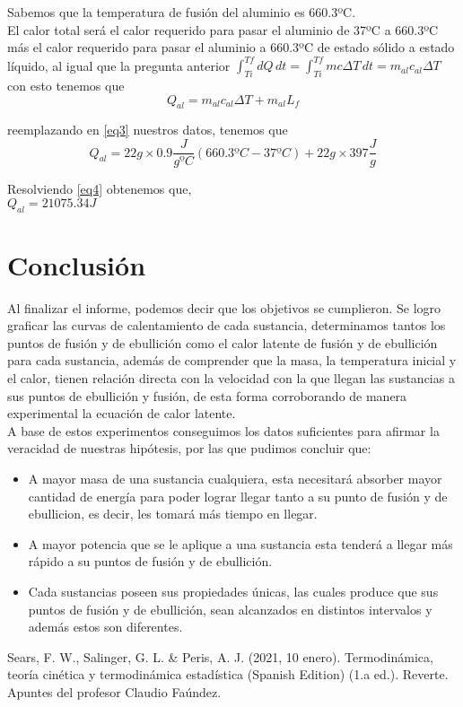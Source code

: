 \documentclass[a4paper, 12p]{article}
\begin{document}
\begin{enumerate}
		     Sabemos que la temperatura de fusión del aluminio es 660.3ºC.\\
		     El calor total será el calor requerido para pasar el aluminio de 37ºC a 660.3ºC más el calor requerido para pasar el aluminio a 660.3ºC de estado sólido a estado líquido, al igual que la pregunta anterior $\int_{Ti}^{Tf} \!dQ \, dt  = \int_{Ti}^{Tf} \! mc \Delta T \, dt =  m_{al}c_{al} \Delta T $ con esto tenemos que
		     \begin{equation}\label{eq3}
		     Q_{al} = m_{al}c_{al} \Delta T + m_{al}L_{f}  
		     \end{equation}
		     
		     reemplazando en \ref{eq3} nuestros datos, tenemos que 
		    \begin{equation}\label{eq4}
		    Q_{al} = 22 g \times 0.9\dfrac{J}{gºC}(660.3ºC - 37ºC) + 22 g \times 397\dfrac{J}{g}
		    \end{equation}
		    
		    Resolviendo \ref{eq4} obtenemos que,\\
		   
		    $Q_{al} = 21075.34 J$
		    
\end{enumerate}



\section{Conclusión}
Al finalizar el informe, podemos decir que los objetivos se cumplieron. Se logro graficar las curvas de calentamiento de cada sustancia, determinamos tantos los puntos de fusión y de ebullición como el calor latente de fusión y 
de ebullición para cada sustancia, además de comprender que la masa, la temperatura inicial y el calor, tienen relación directa con la velocidad con la que llegan las sustancias a sus puntos de ebullición y fusión, de esta forma 
corroborando de manera experimental la ecuación de calor latente. \\
A base de estos experimentos conseguimos los datos suficientes para afirmar la veracidad de nuestras hipótesis, por las que pudimos concluir que:
\begin{itemize}
 \item A mayor masa de una sustancia cualquiera, esta necesitará absorber mayor cantidad de energía para poder lograr llegar tanto a su punto de fusión y de ebullicion, es decir, les tomará más tiempo en llegar.
 \item A mayor potencia que se le aplique a una sustancia esta tenderá a llegar más rápido a su puntos de fusión y de ebullición.
 \item Cada sustancias poseen sus propiedades únicas, las cuales produce que sus puntos de fusión y de ebullición, sean alcanzados en distintos intervalos y además estos son diferentes.
\end{itemize}
\begin{thebibliography}{6}
       Sears, F. W., Salinger, G. L. \& Peris, A. J. (2021, 10 enero). Termodinámica, teoría cinética y termodinámica estadística (Spanish Edition) (1.a ed.). Reverte.
       Apuntes del profesor Claudio Faúndez.
\end{thebibliography}
\end{document}

